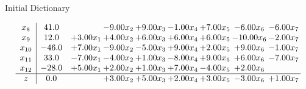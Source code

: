 \documentclass[8pt]{article}
\begin{document}
Initial Dictionary 

\[\begin{array}{c| c c@{\hskip 2pt} c@{\hskip 2pt} c@{\hskip 2pt} c@{\hskip 2pt} c@{\hskip 2pt} c@{\hskip 2pt} c@{\hskip 2pt} }
 x_{8}   &  41.0  &   & -9.00 x_{2} & +  9.00 x_{3} & -1.00 x_{4} & +  7.00 x_{5} & -6.00 x_{6} & -6.00 x_{7}\\
 x_{9}   &  12.0 & +  3.00 x_{1} & +  4.00 x_{2} & +  6.00 x_{3} & +  6.00 x_{4} & +  6.00 x_{5} & -10.00 x_{6} & -2.00 x_{7}\\
 x_{10}   &  -46.0 & +  7.00 x_{1} & -9.00 x_{2} & -5.00 x_{3} & +  9.00 x_{4} & +  2.00 x_{5} & +  9.00 x_{6} & -1.00 x_{7}\\
 x_{11}   &  33.0 & -7.00 x_{1} & -4.00 x_{2} & +  1.00 x_{3} & -8.00 x_{4} & +  9.00 x_{5} & +  6.00 x_{6} & -7.00 x_{7}\\
 x_{12}   &  -28.0 & +  5.00 x_{1} & +  2.00 x_{2} & +  1.00 x_{3} & +  7.00 x_{4} & -4.00 x_{5} & +  2.00 x_{6} &   \\
\hline
z    &  0.0  &   & +  3.00 x_{2} & +  5.00 x_{3} & +  2.00 x_{4} & +  3.00 x_{5} & -3.00 x_{6} & +  1.00 x_{7}\\
\end{array}\]
\end{document}
